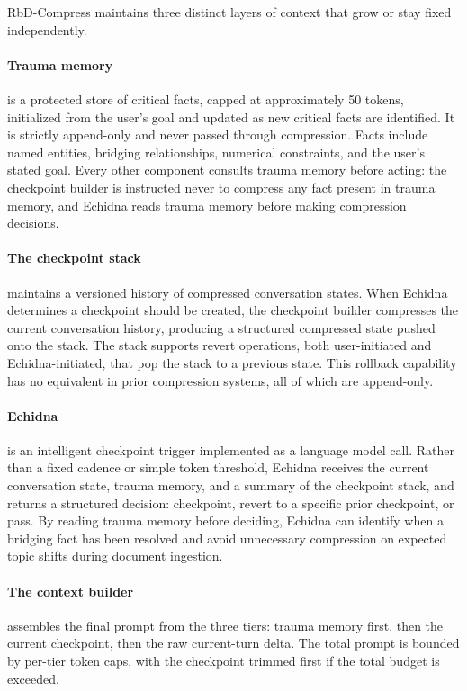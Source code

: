 \documentclass{article}
\begin{document}
RbD-Compress maintains three distinct layers of context that grow or
stay fixed independently.

\paragraph{Trauma memory} is a protected store of critical facts, capped
at approximately 50 tokens, initialized from the user's goal and updated
as new critical facts are identified. It is strictly append-only and
never passed through compression. Facts include named entities, bridging
relationships, numerical constraints, and the user's stated goal. Every
other component consults trauma memory before acting: the checkpoint
builder is instructed never to compress any fact present in trauma
memory, and Echidna reads trauma memory before making compression
decisions.

\paragraph{The checkpoint stack} maintains a versioned history of
compressed conversation states. When Echidna determines a checkpoint
should be created, the checkpoint builder compresses the current
conversation history, producing a structured compressed state pushed
onto the stack. The stack supports revert operations, both user-initiated
and Echidna-initiated, that pop the stack to a previous state. This
rollback capability has no equivalent in prior compression systems, all
of which are append-only.

\paragraph{Echidna} is an intelligent checkpoint trigger implemented
as a language model call. Rather than a fixed cadence or simple token
threshold, Echidna receives the current conversation state, trauma
memory, and a summary of the checkpoint stack, and returns a structured
decision: checkpoint, revert to a specific prior checkpoint, or pass.
By reading trauma memory before deciding, Echidna can identify when a
bridging fact has been resolved and avoid unnecessary compression on
expected topic shifts during document ingestion.

\paragraph{The context builder} assembles the final prompt from the
three tiers: trauma memory first, then the current checkpoint, then the
raw current-turn delta. The total prompt is bounded by per-tier token
caps, with the checkpoint trimmed first if the total budget is exceeded.
\end{document}
